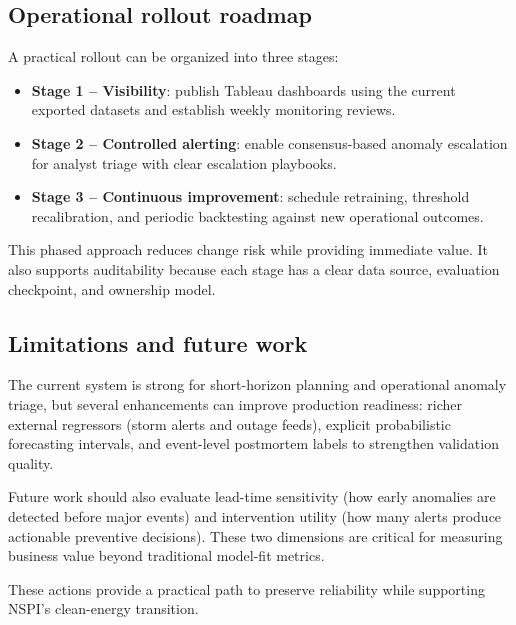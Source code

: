 \subsection{Operational rollout roadmap}
A practical rollout can be organized into three stages:
\begin{itemize}
	\item \textbf{Stage 1 -- Visibility}: publish Tableau dashboards using the current exported datasets and establish weekly monitoring reviews.
	\item \textbf{Stage 2 -- Controlled alerting}: enable consensus-based anomaly escalation for analyst triage with clear escalation playbooks.
	\item \textbf{Stage 3 -- Continuous improvement}: schedule retraining, threshold recalibration, and periodic backtesting against new operational outcomes.
\end{itemize}

This phased approach reduces change risk while providing immediate value. It also supports auditability because each stage has a clear data source, evaluation checkpoint, and ownership model.

\subsection{Limitations and future work}
The current system is strong for short-horizon planning and operational anomaly triage, but several enhancements can improve production readiness: richer external regressors (storm alerts and outage feeds), explicit probabilistic forecasting intervals, and event-level postmortem labels to strengthen validation quality.

Future work should also evaluate lead-time sensitivity (how early anomalies are detected before major events) and intervention utility (how many alerts produce actionable preventive decisions). These two dimensions are critical for measuring business value beyond traditional model-fit metrics.

These actions provide a practical path to preserve reliability while supporting NSPI's clean-energy transition.







